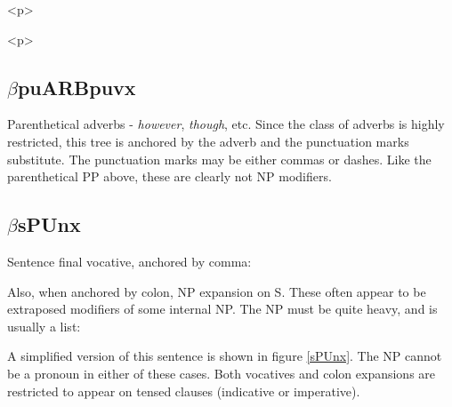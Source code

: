 \begin{rawhtml} <p> \end{rawhtml}
\centering 
\hspace{0.0in} 
\begin{rawhtml} <dl> <dt>{Tree illustrating the use of $\beta$PUpxPUvx <p> </dl> \end{rawhtml}
\label{PUpxPUvx-anger} 
\begin{rawhtml} <p> \end{rawhtml}
 
\subsection{$\beta$puARBpuvx} 
\label{par-adverb} 
 
Parenthetical adverbs - {\it however}, {\it though}, etc. Since the 
class of adverbs is highly restricted, this tree is anchored by the 
adverb and the punctuation marks substitute.  The punctuation marks 
may be either commas or dashes.  Like the parenthetical PP above, 
these are clearly not NP modifiers. 
 
\beginsentences
{}\label{ex:431} 
\endsentences

 
\subsection{$\beta$sPUnx} 
 
Sentence final vocative, anchored by comma:  
 
\beginsentences
{}\label{ex:432} 
\endsentences

 
Also, when anchored by colon, NP expansion on S. These often appear to 
be extraposed modifiers of some internal NP. The NP must be quite 
heavy, and is usually a list: 
 
\beginsentences
{}\label{ex:433} 
\endsentences

 
A simplified version of this sentence is shown in figure 
\ref{sPUnx}. The NP cannot be a pronoun in either of these cases. 
Both vocatives and colon expansions are restricted to appear on tensed 
clauses (indicative or imperative). 
 
